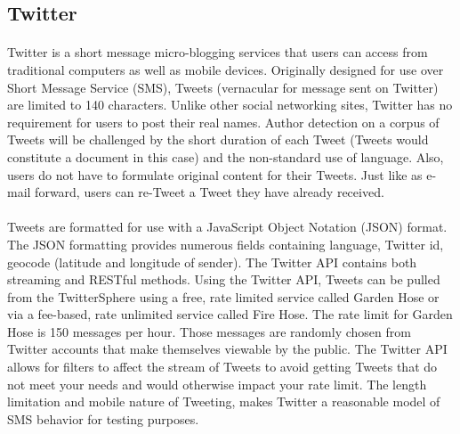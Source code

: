 	\subsection{Twitter}
	\paragraph{} Twitter is a short message micro-blogging services that users can access from traditional computers as well as mobile devices.  Originally designed for use over Short Message Service (SMS), Tweets (vernacular for message sent on Twitter) are limited to 140 characters.  Unlike other social networking sites, Twitter has no requirement for users to post their real names.  Author detection on a corpus of Tweets will be challenged by the short duration of each Tweet (Tweets would constitute a document in this case) and the non-standard use of language.  Also, users do not have to formulate original content for their Tweets.  Just like as e-mail forward, users can re-Tweet a Tweet they have already received.  
	\paragraph{} Tweets are formatted for use with a JavaScript Object Notation (JSON) format. The JSON formatting provides numerous fields containing language, Twitter id, geocode (latitude and longitude of sender).  The Twitter API contains both streaming and RESTful methods.  Using the Twitter API, Tweets can be pulled from the TwitterSphere using a free, rate limited service called Garden Hose or via a fee-based, rate unlimited service called Fire Hose.  The rate limit for Garden Hose is 150 messages per hour.  Those messages are randomly chosen from Twitter accounts that make themselves viewable by the public.  The Twitter API allows for filters to affect the stream of Tweets to avoid getting Tweets that do not meet your needs and would otherwise impact your rate limit.  The length limitation and mobile nature of Tweeting, makes Twitter a reasonable model of SMS behavior for testing purposes.\cite{_streaming_????}

